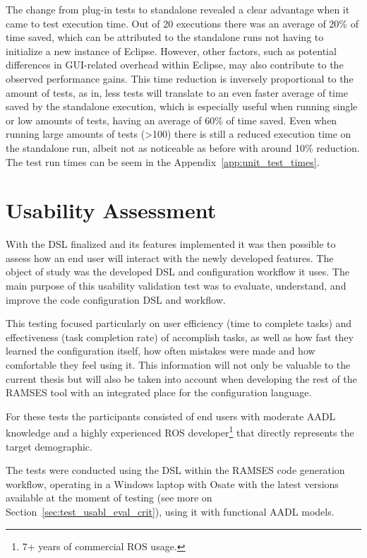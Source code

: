 The change from plug-in tests to standalone revealed a clear advantage when it came to test execution time. Out of 20 executions there was an average of 20\% of time saved, which can be attributed to the standalone runs not having to initialize a new instance of Eclipse. However, other factors, such as potential differences in GUI-related overhead within Eclipse, may also contribute to the observed performance gains. This time reduction is inversely proportional to the amount of tests, as in, less tests will translate to an even faster average of time saved by the standalone execution, which is especially useful when running single or low amounts of tests, having an average of 60\% of time saved. Even when running large amounts of tests (>100) there is still a reduced execution time on the standalone run, albeit not as noticeable as before with around 10\% reduction. The test run times can be seem in the Appendix~\ref{app:unit_test_times}.



\section{Usability Assessment}
\label{sec:test_val}

With the \gls{DSL} finalized and its features implemented it was then possible to assess how an end user will interact with the newly developed features. The object of study was the developed \gls{DSL} and configuration workflow it uses. The main purpose of this usability validation test was to evaluate, understand, and improve the code configuration \gls{DSL} and workflow.

This testing focused particularly on user efficiency (time to complete tasks) and effectiveness (task completion rate) of accomplish tasks, as well as how fast they learned the configuration itself, how often mistakes were made and how comfortable they feel using it. This information will not only be valuable to the current thesis but will also be taken into account when developing the rest of the \gls{RAMSES} tool with an integrated place for the configuration language.

For these tests the participants consisted of end users with moderate \gls{AADL} knowledge and a highly experienced \gls{ROS} developer\footnote{7+ years of commercial \gls{ROS} usage.} that directly represents the target demographic.

The tests were conducted using the \gls{DSL} within the \gls{RAMSES} code generation workflow, operating in a Windows laptop with \gls{Osate} with the latest versions available at the moment of testing (see more on Section~\ref{sec:test_usabl_eval_crit}), using it with functional \gls{AADL} models.

